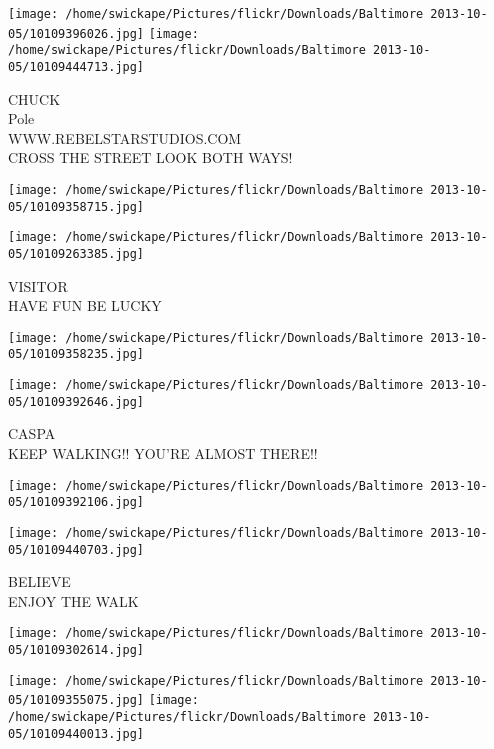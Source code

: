 \documentclass[10pt,letterpaper]{article}
\begin{document}
\texttt{[image: /home/swickape/Pictures/flickr/Downloads/Baltimore 2013-10-05/10109396026.jpg]}
\texttt{[image: /home/swickape/Pictures/flickr/Downloads/Baltimore 2013-10-05/10109444713.jpg]}

CHUCK\\
Pole\\
WWW.REBELSTARSTUDIOS.COM\\
CROSS THE STREET LOOK BOTH WAYS!\\
\pagebreak

\texttt{[image: /home/swickape/Pictures/flickr/Downloads/Baltimore 2013-10-05/10109358715.jpg]}

\vspace{0.25in}
\texttt{[image: /home/swickape/Pictures/flickr/Downloads/Baltimore 2013-10-05/10109263385.jpg]}

VISITOR\\
HAVE FUN BE LUCKY\\
\pagebreak

\texttt{[image: /home/swickape/Pictures/flickr/Downloads/Baltimore 2013-10-05/10109358235.jpg]}

\vspace{0.25in}
\texttt{[image: /home/swickape/Pictures/flickr/Downloads/Baltimore 2013-10-05/10109392646.jpg]}

CASPA\\
KEEP WALKING!! YOU'RE ALMOST THERE!!\\
\pagebreak

\texttt{[image: /home/swickape/Pictures/flickr/Downloads/Baltimore 2013-10-05/10109392106.jpg]}

\vspace{0.25in}
\texttt{[image: /home/swickape/Pictures/flickr/Downloads/Baltimore 2013-10-05/10109440703.jpg]}

BELIEVE\\
ENJOY THE WALK\\
\pagebreak

\texttt{[image: /home/swickape/Pictures/flickr/Downloads/Baltimore 2013-10-05/10109302614.jpg]}

\vspace{0.25in}
\texttt{[image: /home/swickape/Pictures/flickr/Downloads/Baltimore 2013-10-05/10109355075.jpg]}
\texttt{[image: /home/swickape/Pictures/flickr/Downloads/Baltimore 2013-10-05/10109440013.jpg]}
\end{document}
